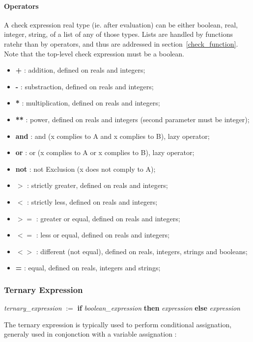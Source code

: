 \paragraph{Operators}
A check expression real type (ie. after evaluation) can be either 
boolean, real, integer, string, of a list of any of those types. 
Lists are handled by functions ratehr than by operators, and thus 
are addressed in section~\ref{check_function}.\\
Note that the top-level check expression must be a boolean.
\begin {itemize}
\item \textbf{+} : addition, defined on reals and integers;
\item \textbf{-} : substraction, defined on reals and integers;
\item \textbf{*} : multiplication, defined on reals and integers;
\item \textbf{**} : power, defined on reals and integers (second parameter must be integer);
\item \textbf{and} : and (x complies to A and x complies to B), lazy operator;
\item \textbf{or} : or (x complies to A or x complies to B), lazy operator;
\item \textbf{not} : not Exclusion (x does not comply to A);
\item \textbf{$>$} : strictly greater, defined on reals and integers;
\item \textbf{$<$} : strictly less, defined on reals and integers;
\item \textbf{$>=$} : greater or equal, defined on reals and integers;
\item \textbf{$<=$} : less or equal, defined on reals and integers;
\item \textbf{$<>$} : different (not equal), defined on reals, integers, strings and booleans;
\item \textbf{=} : equal, defined on reals, integers and strings;
\end {itemize}

\subsubsection {Ternary Expression}

\textit{ternary\_expression} $:=$ \textbf{if} \textit{boolean\_expression} \textbf{then} \textit{expression} \textbf{else} \textit{expression}

The ternary expression is typically used to perform conditional 
assignation, generaly used in conjonction with a variable assignation :

